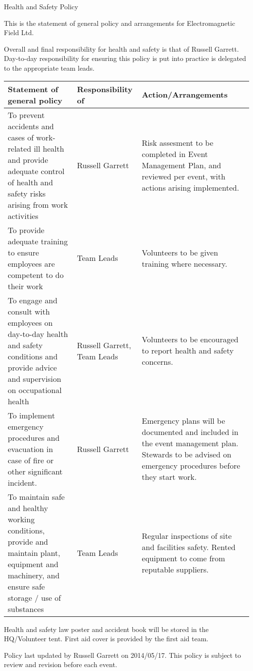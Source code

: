 



Health and Safety Policy

This is the statement of general policy and arrangements for Electromagnetic Field Ltd.

Overall and final responsibility for health and safety is that of Russell Garrett.
Day-to-day responsibility for ensuring this policy is put into practice is delegated to the appropriate team leads.

\tabulinesep=2mm
\begin{tabu}{| p{7cm} | p{3cm} | p{5cm} |} \hline
  \rowfont{\bfseries} Statement of general policy & Responsibility of & Action/Arrangements \\ \hline
To prevent accidents and cases of work-related ill health and provide adequate control of health and safety risks arising from work activities & Russell Garrett & Risk assesment to be completed in Event Management Plan, and reviewed per event, with actions arising implemented. \\ \hline
To provide adequate training to ensure employees are competent to do their work & Team Leads & Volunteers to be given training where necessary. \\ \hline
To engage and consult with employees on day-to-day health and safety conditions and provide advice and supervision on occupational health & Russell Garrett, Team Leads & Volunteers to be encouraged to report health and safety concerns. \\ \hline
To implement emergency procedures and evacuation in case of fire or other significant incident. & Russell Garrett & Emergency plans will be documented and included in the event management plan. Stewards to be advised on emergency procedures before they start work. \\ \hline
To maintain safe and healthy working conditions, provide and maintain plant, equipment and machinery, and ensure safe storage / use of substances & Team Leads & Regular inspections of site and facilities safety. Rented equipment to come from reputable suppliers. \\ \hline
\end{tabu}

Health and safety law poster and accident book will be stored in the HQ/Volunteer tent. First aid cover is provided by the first aid team.

Policy last updated by Russell Garrett on 2014/05/17. This policy is subject to review and revision before each event.

